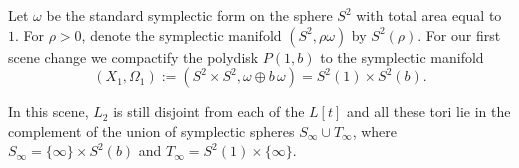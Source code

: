 \documentclass[12pt]{amsart}
\newtheorem{proposition}[theorem]{Proposition}
\theoremstyle{definition}
\newcommand{\ZZ}{{\mathbb Z}}
\begin{document}





\bigskip
{} Let $\omega$ be the standard symplectic form on the sphere $S^2$ with total area equal to $1$. For $\rho>0$, denote the symplectic manifold $(S^2, \rho \omega)$ by $S^2(\rho)$. For our first scene change we compactify the polydisk $P(1,b)$ to the symplectic manifold $$(X_1,\Omega_1) := (S^2 \times S^2, \omega \oplus b \, \omega) =S^2(1) \times S^2(b).$$ 

In this scene, $L_2$ is still disjoint from each of the $L[t]$ and all these tori lie in the complement of the union of symplectic spheres $S_{\infty} \cup T_{\infty}$, where $S_{\infty} = \{\infty\} \times S^2(b)$ and $T_{\infty} = S^2(1) \times \{\infty\}$.
 

\end{document}
